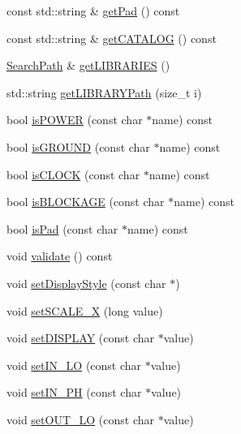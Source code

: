 \begin{DoxyCompactItemize}
const std\+::string \& \hyperlink{classCRL_1_1Environment_a5f0df5fadd73c2246f7e6775314bb5fa}{get\+Pad} () const
\item 
const std\+::string \& \hyperlink{classCRL_1_1Environment_a3bb5c9e02c1391142e439f023bdc0355}{get\+C\+A\+T\+A\+L\+OG} () const
\item 
\hyperlink{classCRL_1_1SearchPath}{Search\+Path} \& \hyperlink{classCRL_1_1Environment_acf7a3bc42cfb4b98f1da859ed27ca97e}{get\+L\+I\+B\+R\+A\+R\+I\+ES} ()
\item 
std\+::string \hyperlink{classCRL_1_1Environment_afe29d7cab0055cabb7667eabcbdd32db}{get\+L\+I\+B\+R\+A\+R\+Y\+Path} (size\+\_\+t i)
\item 
bool \hyperlink{classCRL_1_1Environment_a9eb93e10f79278b4642fc9815a83fdff}{is\+P\+O\+W\+ER} (const char $\ast$name) const
\item 
bool \hyperlink{classCRL_1_1Environment_a4cad6f06ac67c1a688b0b98dfa57d7ea}{is\+G\+R\+O\+U\+ND} (const char $\ast$name) const
\item 
bool \hyperlink{classCRL_1_1Environment_a9ae0d48d88797a7a5421edf5978bf3d7}{is\+C\+L\+O\+CK} (const char $\ast$name) const
\item 
bool \hyperlink{classCRL_1_1Environment_a6f1ce36d1636f2ec701b0904f461e6b7}{is\+B\+L\+O\+C\+K\+A\+GE} (const char $\ast$name) const
\item 
bool \hyperlink{classCRL_1_1Environment_a8a82d0a983c502e1dc97944ab496d8e5}{is\+Pad} (const char $\ast$name) const
\item 
void \hyperlink{classCRL_1_1Environment_a4ea88dd9784318190a3705345c47904a}{validate} () const
\item 
void \hyperlink{classCRL_1_1Environment_a85fa721541a39571c3ade06992035bad}{set\+Display\+Style} (const char $\ast$)
\item 
void \hyperlink{classCRL_1_1Environment_ad14d519b0a4c964d7a786739499571dd}{set\+S\+C\+A\+L\+E\+\_\+X} (long value)
\item 
void \hyperlink{classCRL_1_1Environment_a69416219076a00900f58d0d5e0ac55a9}{set\+D\+I\+S\+P\+L\+AY} (const char $\ast$value)
\item 
void \hyperlink{classCRL_1_1Environment_ad204e8f425d3a35bba494a60d4b4ff69}{set\+I\+N\+\_\+\+LO} (const char $\ast$value)
\item 
void \hyperlink{classCRL_1_1Environment_a62965d987f17d2853afd44004ff20b1b}{set\+I\+N\+\_\+\+PH} (const char $\ast$value)
\item 
void \hyperlink{classCRL_1_1Environment_a57a42a469f6cf94ba39e5b7aacfa738c}{set\+O\+U\+T\+\_\+\+LO} (const char $\ast$value)

\end{DoxyCompactItemize}
